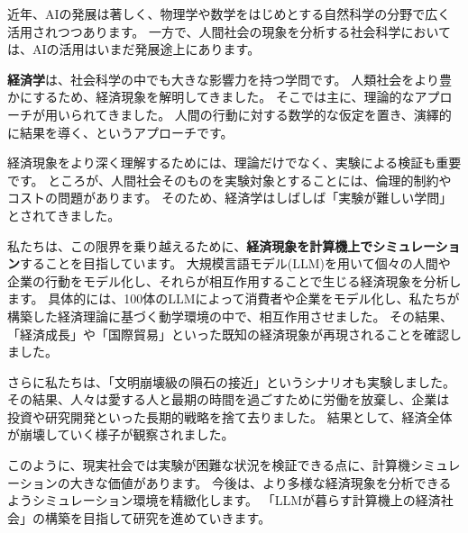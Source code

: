 近年、AIの発展は著しく、物理学や数学をはじめとする自然科学の分野で広く活用されつつあります。
一方で、人間社会の現象を分析する社会科学においては、AIの活用はいまだ発展途上にあります。

\textbf{経済学}は、社会科学の中でも大きな影響力を持つ学問です。
人類社会をより豊かにするため、経済現象を解明してきました。
そこでは主に、理論的なアプローチが用いられてきました。
人間の行動に対する数学的な仮定を置き、演繹的に結果を導く、というアプローチです。

経済現象をより深く理解するためには、理論だけでなく、実験による検証も重要です。
ところが、人間社会そのものを実験対象とすることには、倫理的制約やコストの問題があります。
そのため、経済学はしばしば「実験が難しい学問」とされてきました。

私たちは、この限界を乗り越えるために、\textbf{経済現象を計算機上でシミュレーション}することを目指しています。
大規模言語モデル(LLM)を用いて個々の人間や企業の行動をモデル化し、それらが相互作用することで生じる経済現象を分析します。
具体的には、100体のLLMによって消費者や企業をモデル化し、私たちが構築した経済理論に基づく動学環境の中で、相互作用させました。
その結果、「経済成長」や「国際貿易」といった既知の経済現象が再現されることを確認しました。

さらに私たちは、「文明崩壊級の隕石の接近」というシナリオも実験しました。
その結果、人々は愛する人と最期の時間を過ごすために労働を放棄し、企業は投資や研究開発といった長期的戦略を捨て去りました。
結果として、経済全体が崩壊していく様子が観察されました。

このように、現実社会では実験が困難な状況を検証できる点に、計算機シミュレーションの大きな価値があります。
今後は、より多様な経済現象を分析できるようシミュレーション環境を精緻化します。
「LLMが暮らす計算機上の経済社会」の構築を目指して研究を進めていきます。

